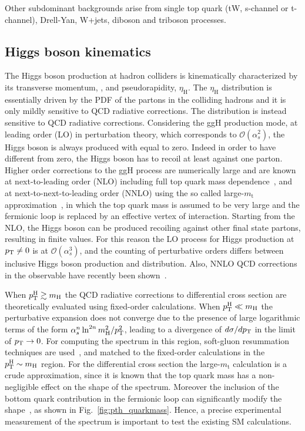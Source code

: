 Other subdominant backgrounds arise from single top quark (tW, s-channel or t-channel), Drell-Yan, W+jets, diboson and triboson processes.


\subsection{Higgs boson kinematics}

The Higgs boson production at hadron colliders is kinematically characterized by its transverse momentum, \pth, and pseudorapidity, $\eta_\mathrm{H}$. The $\eta_\mathrm{H}$ distribution is essentially driven by the PDF of the partons in the colliding hadrons and it is only mildly sensitive to QCD radiative corrections. The \pth distribution is instead sensitive to QCD radiative corrections. 
Considering the ggH production mode, at leading order (LO) in perturbation theory, which corresponds to $\mathcal{O}(\alpha_s^2)$, the Higgs boson is always produced with \pth equal to zero. Indeed in order to have \pt different from zero, the Higgs boson has to recoil at least against one parton. Higher order corrections to the ggH process are numerically large and are known at next-to-leading order (NLO) including full top quark mass dependence~\cite{Spira:1995rr,Harlander:2005rq}, and at next-to-next-to-leading order (NNLO) using the so called large-$m_\mathrm{t}$ approximation~\cite{Ravindran:2003um,Catani:2007vq,Anastasiou:2015ema}, in which the top quark mass is assumed to be very large and the fermionic loop is replaced by an effective vertex of interaction. Starting from the NLO, the Higgs boson can be produced recoiling against other final state partons, resulting in finite \pth values. For this reason the LO process for Higgs production at $p_\mathrm{T} \neq 0$ is at $\mathcal{O}(\alpha_s^3)$, and the counting of perturbative orders differs between inclusive Higgs boson production and \pth distribution. Also, NNLO QCD corrections in the \pth observable have recently been shown~\cite{Chen:2016zka}.

When $p_\mathrm{T}^\mathrm{H} \gtrsim m_\mathrm{H}$ the QCD radiative corrections to \pth differential cross section are theoretically evaluated using fixed-order calculations. When $p_\mathrm{T}^\mathrm{H} \ll m_\mathrm{H}$ the perturbative expansion does not converge due to the presence of large logarithmic terms of the form $\alpha_s^n \ln^{2n}m_\mathrm{H}^2/p_\mathrm{T}^2$, leading to a divergence of $d\sigma/dp_\mathrm{T}$ in the limit of $p_\mathrm{T}\to0$. For computing the \pth spectrum in this region, soft-gluon resummation techniques are used~\cite{Bozzi:2005wk,deFlorian:2012mx}, and matched to the fixed-order calculations in the $p_\mathrm{T}^\mathrm{H} \sim m_\mathrm{H}$ region.
For the \pth differential cross section the large-$m_\mathrm{t}$ calculation is a crude approximation, since it is known that the top quark mass has a non-negligible effect on the shape of the spectrum. Moreover the inclusion of the bottom quark contribution in the fermionic loop can significantly modify the \pth shape~\cite{Grazzini:2013mca}, as shown in Fig.~\ref{fig:pth_quarkmass}. Hence, a precise experimental measurement of the \pth spectrum is important to test the existing SM calculations. 

